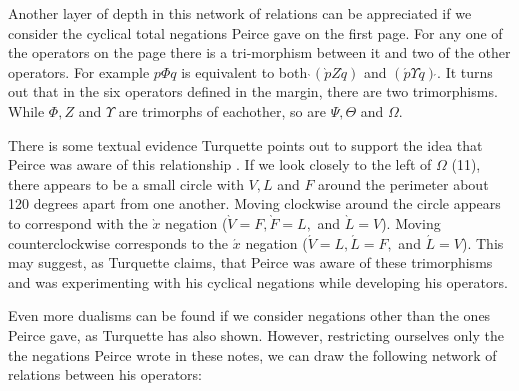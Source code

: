 \documentclass[12pt]{article}
\begin{document}
Another layer of depth in this network of relations can be appreciated if we consider the cyclical total negations Peirce gave on the first page. For any one of the operators on the page there is a tri-morphism between it and two of the other operators. For example $p\Phi q$ is equivalent to both $\grave{}(\grave{p}Z\grave{q})$ and $(\acute{p}\Upsilon \acute{q})\acute{}$. It turns out that in the six operators defined in the margin, there are two trimorphisms. While $\Phi, Z$ and $\Upsilon$ are trimorphs of eachother, so are $\Psi, \Theta$ and $\Omega$.

There is some textual evidence Turquette points out to support the idea that Peirce was aware of this relationship \citep{turquette1972dualism}. If we look closely to the left of $\Omega$ (11), there appears to be a small circle with $V, L$ and $F$ around the perimeter about 120 degrees apart from one another. Moving clockwise around the circle appears to correspond with the $\grave{x}$ negation ($\grave{V}=F, \grave{F}=L,$ and $\grave{L}=V$). Moving counterclockwise corresponds to the $\acute{x}$ negation ($\acute{V}=L, \acute{L}=F,$ and $\acute{L}=V$). This may suggest, as Turquette claims, that Peirce was aware of these trimorphisms and was experimenting with his cyclical negations while developing his operators.

Even more dualisms can be found if we consider negations other than the ones Peirce gave, as Turquette has also shown. However, restricting ourselves only the the negations Peirce wrote in these notes, we can draw the following network of relations between his operators:
\end{document}
